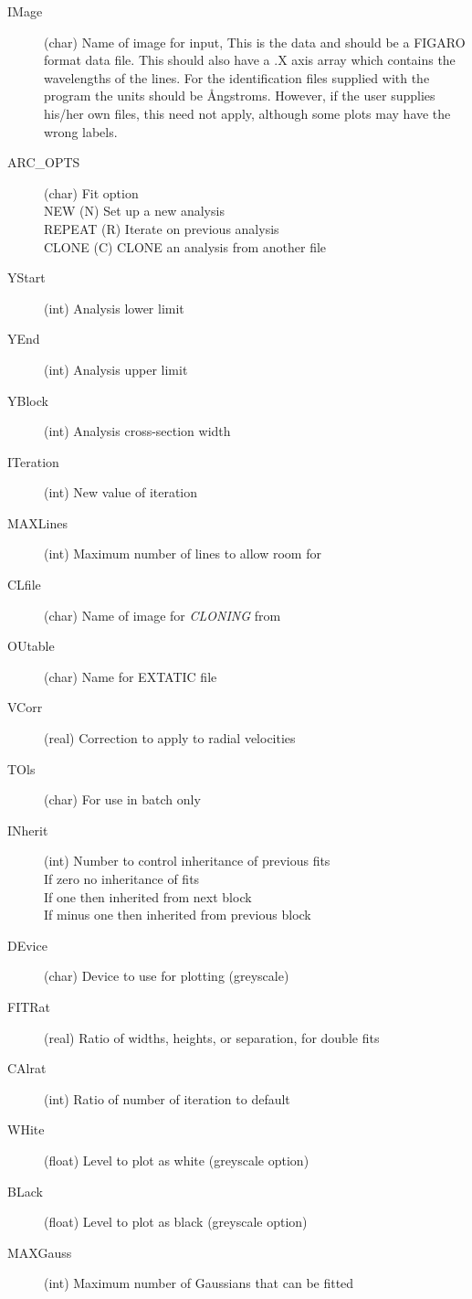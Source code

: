 \begin{description}
\item[IMage] (char) Name of image for input, This is the data and should
be a FIGARO format data file.
This should also have a .X axis array which contains the wavelengths of
the lines. For the identification files supplied with the program the
units should be {\AA}ngstroms. However, if the user supplies his/her own
files, this need not apply, although some plots may have the wrong
labels.
\item[ARC\_OPTS] (char) Fit option\\
NEW    (N) Set up a new analysis\\
REPEAT (R) Iterate on  previous analysis\\
CLONE  (C) CLONE an analysis from another file
\item[YStart] (int) Analysis lower limit
\item[YEnd] (int) Analysis upper limit
\item[YBlock] (int) Analysis cross-section width
\item[ITeration] (int) New value of iteration
\item[MAXLines] (int) Maximum number of lines to allow room for
\item[CLfile] (char) Name of image for {\em CLONING} from
\item[OUtable] (char) Name for EXTATIC file
\item[VCorr] (real) Correction to apply to radial velocities
\item[TOls] (char) For use in batch only
\item[INherit] (int) Number to control inheritance of  previous fits\\
If zero no inheritance of fits\\
If one then inherited from next block\\
If minus one then inherited from previous block
\item[DEvice] (char) Device to use for plotting (greyscale)
\item[FITRat] (real) Ratio of widths, heights, or separation, for
double fits
\item[CAlrat] (int) Ratio of number of iteration to default
\item[WHite] (float) Level to plot as white (greyscale option)
\item[BLack] (float) Level to plot as black (greyscale option)
\item[MAXGauss] (int) Maximum number of Gaussians that can be fitted

\end{description}
